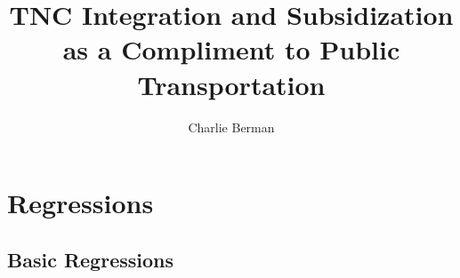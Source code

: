 \documentclass [11pt]{article}
\title{TNC Integration and Subsidization as a Compliment to Public Transportation}
\author{Charlie Berman}
\begin{document}
\maketitle

\section*{Regressions}
\subsection*{Basic Regressions}
\begingroup
\centering
\end{document}
